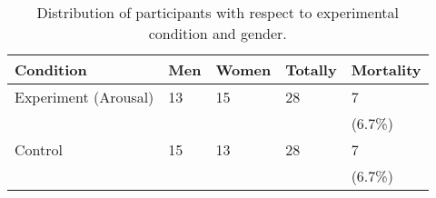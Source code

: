 


\begin{table}
  \centering
  \caption{Distribution of participants with respect to experimental
    condition and gender.}
  \label{table:participants}
  \begin{tabularx}{0.45\textwidth}{XXXXX}
    \toprule
    Condition & Men & Women & Totally & Mortality \\ 
    \midrule
    Experiment (Arousal) & 13 & 15 & 28 & 7 \\ &&&& (6.7\%) \\
    Control & 15 & 13 & 28 & 7 \\ &&&& (6.7\%) \\
    \bottomrule
  \end{tabularx}
\end{table}









